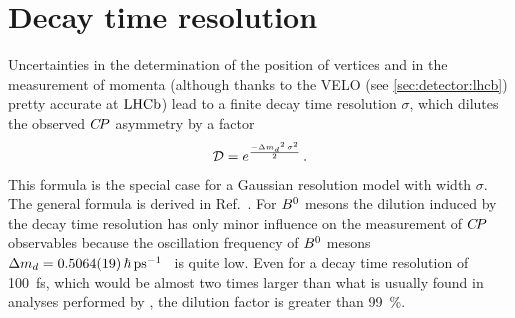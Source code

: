 \section{Decay time resolution}
\label{sec:dataanalysis:resolution}

Uncertainties in the determination of the position of vertices and in the
measurement of momenta (although thanks to the VELO (see
\cref{sec:detector:lhcb}) pretty accurate  at $\lhcb$) lead to a finite decay
time resolution $\sigma$, which dilutes the observed $\CP$ asymmetry by a
factor
\begin{align}
  \mathcal{D} = e^{\frac{-\dmd^2\,\sigma^2}{2}} \, .
\label{eq:dataanalysis:resolution:dilution}
\end{align}
This formula is the special case for a Gaussian resolution model with width
$\sigma$. The general formula is derived in
Ref.~\cite{ResolutionDilutionFactor}. For $\Bd$ mesons the dilution induced by
the decay time resolution has only minor influence on the measurement of $\CP$
observables because the oscillation frequency of $\Bd$ mesons $\dmd =
\SI{0.5064\pm0.0019}{\hbar\invps}$~\cite{HFAG} is quite low. Even for a decay time
resolution of \SI{100}{\fs}, which would be almost two times larger than what
is usually found in analyses performed by \lhcb, the dilution factor is
greater than \SI{99}{\percent}.